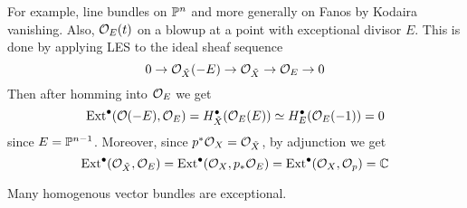 For example, line bundles on $\P^n$ and more generally on Fanos by Kodaira vanishing. Also, $\O_{E}(t)$ on a blowup at a point with exceptional divisor $E$. This is done by applying LES to the ideal sheaf sequence
\begin{equation*}
    0 \to \O_{\tilde X}(-E) \to \O_{\tilde X} \to \O_E \to 0
\end{equation*}
Then after homming into $\O_E$ we get
\begin{equation*}
    \Ext^\bullet(\O(-E),\O_E)
        = H^\bullet_{\tilde X}(\O_E(E))
        \simeq H^\bullet_E(\O_E(-1))=0
\end{equation*}
since $E=\P^{n-1}$. Moreover, since $p^*\O_X=\O_{\tilde X}$, by adjunction we get
\begin{equation*}
    \Ext^\bullet(\O_{\tilde X},\O_E)
        = \Ext^\bullet(\O_X,p_*\O_E)
        = \Ext^\bullet(\O_X,\O_p)
        = \C
\end{equation*}

Many homogenous vector bundles are exceptional.


